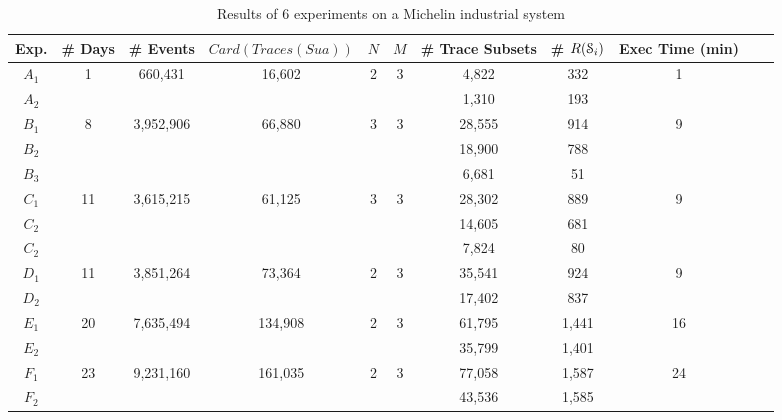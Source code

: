 \begin{table}
\begin{center}
\begin{tabular}{| c | c | c | c | c | c | c | c | c | c | c |}
\hline
Exp. & \# Days & \# Events & $Card(Traces(Sua))$ & $N$ & $M$ & \# Trace Subsets & \# $R(\EuScript{S}_i)$ & Exec Time (min)\\
\hline
\hline
$A_1$ & 1     & 660,431   & 16,602  & 2 & 3 & 4,822  & 332   & 1 \\
$A_2$ &       &           &         &   &   & 1,310  & 193   &   \\
\hline
$B_1$ & 8     & 3,952,906 & 66,880  & 3 & 3 & 28,555 & 914   & 9 \\
$B_2$ &       &           &         &   &   & 18,900 & 788   &   \\
$B_3$ &       &           &         &   &   &  6,681 &  51   &   \\
\hline
$C_1$ & 11    & 3,615,215 & 61,125  & 3 & 3 & 28,302 & 889   & 9 \\
$C_2$ &       &           &         &   &   & 14,605 & 681   &   \\
$C_2$ &       &           &         &   &   &  7,824 &  80   &   \\
\hline
$D_1$ & 11    & 3,851,264 & 73,364  & 2 & 3 & 35,541 & 924   & 9 \\
$D_2$ &       &           &         &   &   & 17,402 & 837   &   \\
\hline
$E_1$ & 20    & 7,635,494 & 134,908 & 2 & 3 & 61,795 & 1,441 & 16 \\
$E_2$ &       &           &         &   &   & 35,799 & 1,401 &    \\
\hline
$F_1$ & 23    & 9,231,160 & 161,035 & 2 & 3 & 77,058 & 1,587 & 24 \\
$F_2$ &       &           &         &   &   & 43,536 & 1,585 &    \\
\hline
\end{tabular}
\end{center}

\caption{Results of 6 experiments on a Michelin industrial system}
\label{fig:results}
\end{table}

